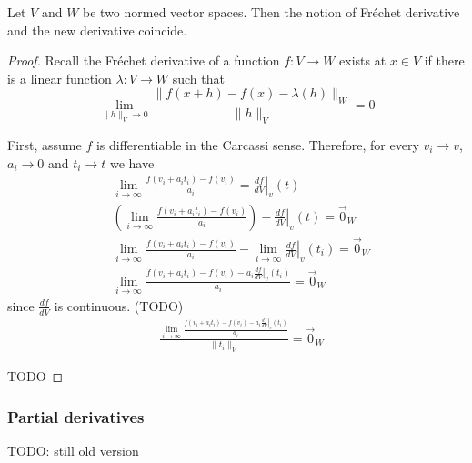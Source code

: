 \documentclass[11pt,letterpaper,fleqn]{memoir}
\begin{document}
\begin{conj}
	Let $V$ and $W$ be two normed vector spaces. Then the notion of Fr\'{e}chet derivative and the new derivative coincide.
\end{conj}

\begin{proof}
	Recall the Fr\'{e}chet derivative of a function $f: V \to W$ exists at $x \in V$ if there is a linear function $\lambda: V \to W$ such that
	\begin{equation}
		\lim_{\lVert h \rVert_{V} \to 0} \frac{\lVert f(x + h) - f(x) - \lambda(h) \rVert_{W}}{\lVert h \rVert_{V}} = 0 
	\end{equation}
	
	First, assume $f$ is differentiable in the Carcassi sense. Therefore, for every $v_i \to v$, $a_i \to 0$ and $t_i \to t$ we have
	\begin{equation}
		\begin{aligned}
			&\lim_{i \to \infty} \frac{f(v_{i} + a_{i}t_{i}) - f(v_{i})}{a_{i}} = \left.\frac{df}{dV}\right|_{v}(t) \\
			&\left( \lim_{i \to \infty} \frac{f(v_{i} + a_{i}t_{i}) - f(v_{i})}{a_{i}} \right) - \left.\frac{df}{dV}\right|_{v}(t) = \vec{0}_{W} \\
			&\lim_{i \to \infty} \frac{f(v_{i} + a_{i}t_{i}) - f(v_{i})}{a_{i}} - \lim_{i \to \infty}  \left.\frac{df}{dV}\right|_{v}(t_i) = \vec{0}_{W} \\
			&\lim_{i \to \infty} \frac{f(v_{i} + a_{i}t_{i}) - f(v_{i}) - a_{i}\left.\frac{df}{dV}\right|_{v}(t_i)}{a_{i}} = \vec{0}_{W}
		\end{aligned}
	\end{equation}
	since $\frac{df}{dV}$ is continuous. (TODO) 
	\begin{equation}
		\begin{aligned}
			&\frac{\lim_{i \to \infty} \frac{f(v_{i} + a_{i}t_{i}) - f(v_{i}) - a_{i}\left.\frac{df}{dV}\right|_{v}(t_i)}{a_{i}}}{\lVert t_i \rVert_{V}} = \vec{0}_{W}
		\end{aligned}
	\end{equation}
	
	TODO	
\end{proof}


\subsubsection{Partial derivatives}

TODO: still old version
\end{document}
